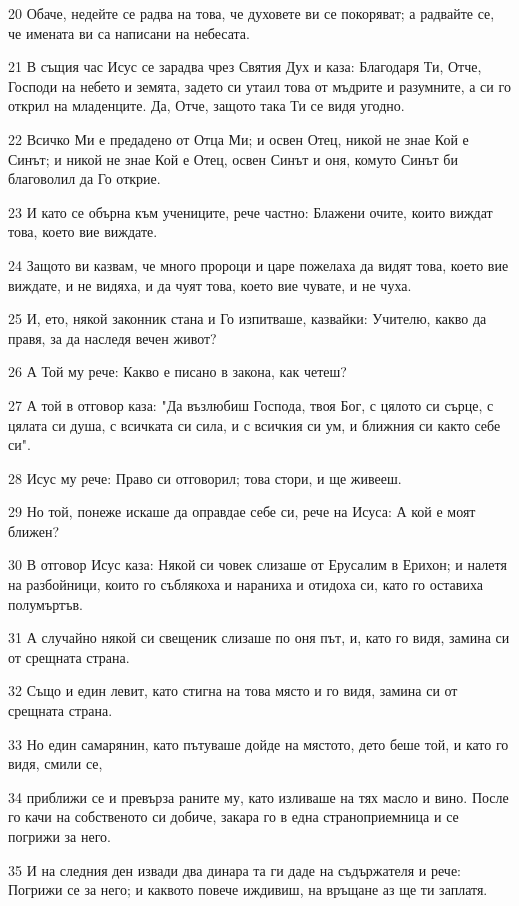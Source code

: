 \par 20 Обаче, недейте се радва на това, че духовете ви се покоряват; а радвайте се, че имената ви са написани на небесата.
\par 21 В същия час Исус се зарадва чрез Святия Дух и каза: Благодаря Ти, Отче, Господи на небето и земята, задето си утаил това от мъдрите и разумните, а си го открил на младенците. Да, Отче, защото така Ти се видя угодно.
\par 22 Всичко Ми е предадено от Отца Ми; и освен Отец, никой не знае Кой е Синът; и никой не знае Кой е Отец, освен Синът и оня, комуто Синът би благоволил да Го открие.
\par 23 И като се обърна към учениците, рече частно: Блажени очите, които виждат това, което вие виждате.
\par 24 Защото ви казвам, че много пророци и царе пожелаха да видят това, което вие виждате, и не видяха, и да чуят това, което вие чувате, и не чуха.
\par 25 И, ето, някой законник стана и Го изпитваше, казвайки: Учителю, какво да правя, за да наследя вечен живот?
\par 26 А Той му рече: Какво е писано в закона, как четеш?
\par 27 А той в отговор каза: "Да възлюбиш Господа, твоя Бог, с цялото си сърце, с цялата си душа, с всичката си сила, и с всичкия си ум, и ближния си както себе си".
\par 28 Исус му рече: Право си отговорил; това стори, и ще живееш.
\par 29 Но той, понеже искаше да оправдае себе си, рече на Исуса: А кой е моят ближен?
\par 30 В отговор Исус каза: Някой си човек слизаше от Ерусалим в Ерихон; и налетя на разбойници, които го съблякоха и нараниха и отидоха си, като го оставиха полумъртъв.
\par 31 А случайно някой си свещеник слизаше по оня път, и, като го видя, замина си от срещната страна.
\par 32 Също и един левит, като стигна на това място и го видя, замина си от срещната страна.
\par 33 Но един самарянин, като пътуваше дойде на мястото, дето беше той, и като го видя, смили се,
\par 34 приближи се и превърза раните му, като изливаше на тях масло и вино. После го качи на собственото си добиче, закара го в една страноприемница и се погрижи за него.
\par 35 И на следния ден извади два динара та ги даде на съдържателя и рече: Погрижи се за него; и каквото повече иждивиш, на връщане аз ще ти заплатя.
